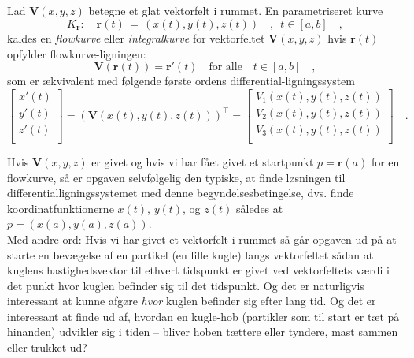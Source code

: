\begin{definition} \label{defFlowIntKurver}
Lad $\mathbf{V}(x,y,z)$ betegne et glat vektorfelt i rummet. En parametriseret kurve
\begin{equation}
K_{\mathbf r}: \quad {\mathbf r}(t) \, = \, \left(x(t), y(t), z(t)\right) \quad , \, \, \,  t \in [a,b] \quad,
\end{equation}
kaldes en \emph{flowkurve} eller \emph{integralkurve} for vektorfeltet $\mathbf{V}(x,y,z)$ hvis ${\mathbf r}(t)$
opfylder flowkurve-ligningen:
\begin{equation}
{\mathbf{V}}(\mathbf{r}(t)) = \mathbf{r}'(t) \quad \textrm{for alle} \quad t \in [a,b]\quad ,
\end{equation}
som er ækvivalent med følgende første ordens differential-ligningssystem
\begin{equation}
\left[
  \begin{array}{c}
    x'(t) \\
    y'(t) \\
    z'(t) \\
  \end{array}
\right] = \left(\mathbf{V}(x(t), y(t), z(t))\right)^{\top} = \left[
                                                  \begin{array}{c}
                                                    V_{1}(x(t), y(t), z(t)) \\
                                                     V_{2}(x(t), y(t), z(t)) \\
                                                     V_{3}(x(t), y(t), z(t)) \\
                                                  \end{array}
                                                \right] \quad .
\end{equation}
\end{definition}


\begin{aha}
Hvis $\mathbf{V}(x,y,z)$ er givet og hvis vi har fået givet et startpunkt $p = \mathbf{r}(a)$ for en flowkurve, så er opgaven selvfølgelig den typiske, at finde løsningen til differentialligningssystemet med denne begyndelsesbetingelse, dvs. finde koordinatfunktionerne $x(t)$, $y(t)$, og $z(t)$ således at $p = (x(a), y(a), z(a))$. \\

Med andre ord:
Hvis vi har givet et vektorfelt i rummet så går opgaven ud på at starte en bevægelse af en partikel (en lille kugle) langs vektorfeltet
sådan at kuglens hastighedsvektor til ethvert tidspunkt er givet ved vektorfeltets værdi i det punkt hvor kuglen befinder sig til det tidspunkt.
Og det er naturligvis interessant at kunne afgøre \emph{hvor} kuglen befinder sig efter lang tid. Og det er interessant at finde ud af, hvordan en kugle-hob
(partikler som til start er tæt på hinanden) udvikler sig i tiden -- bliver hoben tættere eller tyndere, mast sammen eller trukket ud?
\end{aha}


